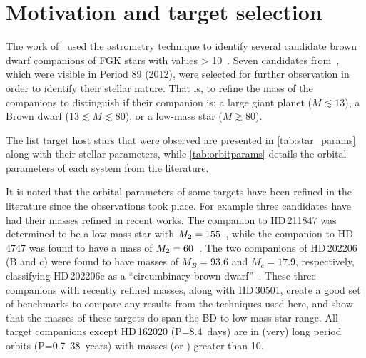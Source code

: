 
\section{Motivation and target selection}
\label{sec:target_motivation}

The work of~\citet{sahlmann_search_2011} used the astrometry technique to identify several candidate brown dwarf companions of {FGK} stars with \Mtwosini{} values > 10~\Mjup{}.
Seven candidates from~\citet{sahlmann_search_2011}, which were visible in {Period 89} (2012), were selected for further observation in order to identify their stellar nature.
That is, to refine the mass of the companions to distinguish if their companion is: a large giant planet (\(M \apprle 13\)\Mjup{}), a Brown dwarf (\(13 \apprle M \apprle 80\)\Mjup{}), or a low-mass star (\(M \apprge 80\)\Mjup).

The list target host stars that were observed are presented in \cref{tab:star_params} along with their stellar parameters, while \cref{tab:orbitparams} details the orbital parameters of each system from the literature.

It is noted that the orbital parameters of some targets have been refined in the literature since the observations took place.
For example three candidates have had their masses refined in recent works.
The companion to {HD\,211847} was determined to be a low mass star with \({M}_{2}=155\)\Mjup{}~\citep{moutou_eccentricity_2017}, while the companion to {HD\,4747} was found to have a mass of \({M}_{2}=60\)\Mjup{}~\citep{crepp_trends_2016}.
The two companions of {HD\,202206} (B and c) were found to have masses of \({M}_{B}=93.6\)\Mjup{} and \({M}_{c}=17.9\)\Mjup{}, respectively, classifying {HD\,202206}c as a ``circumbinary brown dwarf''~\citep{benedict_hd_2017}.
These three companions with recently refined masses, along with {HD\,30501}, create a good set of benchmarks to compare any results from the techniques used here, and show that the masses of these targets do span the {BD} to low-mass star range.
All target companions except {HD\,162020} (P=8.4~days) are in (very) long period orbits (P=0.7--38~years) with masses (or \Mtwosini{}) greater than 10\Mjup{}.

\begin{landscape}
    
    
\end{landscape}

